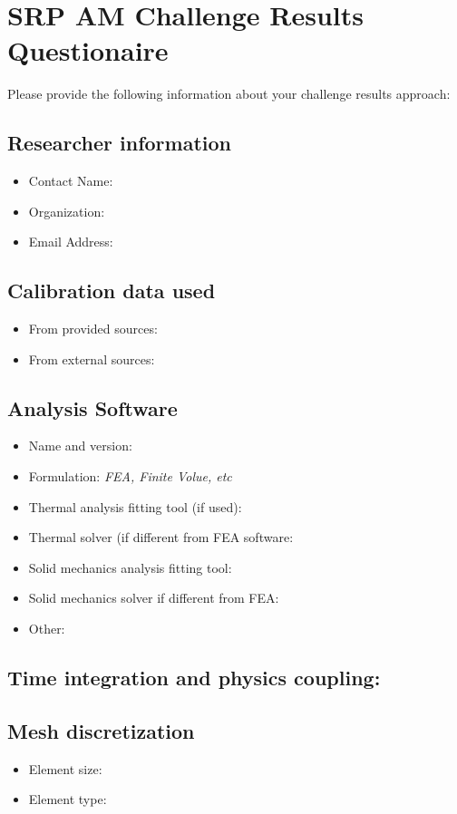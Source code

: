 \documentclass[12pt]{article}
\begin{document}
\section*{SRP AM Challenge Results Questionaire}
Please provide the following information about your challenge results approach:

\subsection*{Researcher information}
\begin{itemize}
    \item Contact Name:
    \item Organization:
    \item Email Address:
\end{itemize}

\subsection*{Calibration data used}
\begin{itemize}
    \item From provided sources:
    \item From external sources:
\end{itemize}

\subsection*{Analysis Software}
\begin{itemize}
    \item Name and version:
    \item Formulation: \emph{FEA, Finite Volue, etc}
    \item Thermal analysis fitting tool (if used):
    \item Thermal solver (if different from FEA software:
    \item Solid mechanics analysis fitting tool:
    \item Solid mechanics solver if different from FEA:
    \item Other:
\end{itemize}

\subsection*{Time integration and physics coupling:}

\subsection*{Mesh discretization}
\begin{itemize}
    \item Element size:
    \item Element type:
\end{itemize}
\end{document}
